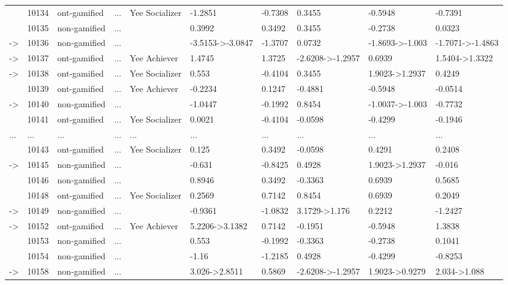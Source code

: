\documentclass[6pt]{article}
\begin{document}
\begin{landscape}
{\begin{longtable}{llllllllll}
&10134&ont-gamified&...&Yee Socializer&-1.2851&-0.7308&0.3455&-0.5948&-0.7391\tabularnewline
&10135&non-gamified&...&&0.3992&0.3492&0.3455&-0.2738&0.0323\tabularnewline
-\textgreater &10136&non-gamified&...&&-3.5153-\textgreater -3.0847&-1.3707&0.0732&-1.8693-\textgreater -1.003&-1.7071-\textgreater -1.4863\tabularnewline
-\textgreater &10137&ont-gamified&...&Yee Achiever&1.4745&1.3725&-2.6208-\textgreater -1.2957&0.6939&1.5404-\textgreater 1.3322\tabularnewline
-\textgreater &10138&ont-gamified&...&Yee Socializer&0.553&-0.4104&0.3455&1.9023-\textgreater 1.2937&0.4249\tabularnewline
&10139&ont-gamified&...&Yee Achiever&-0.2234&0.1247&-0.4881&-0.5948&-0.0514\tabularnewline
-\textgreater &10140&non-gamified&...&&-1.0447&-0.1992&0.8454&-1.0037-\textgreater -1.003&-0.7732\tabularnewline
&10141&ont-gamified&...&Yee Socializer&0.0021&-0.4104&-0.0598&-0.4299&-0.1946\tabularnewline
...&...&...&...&...&...&...&...&...&...\tabularnewline
&10143&ont-gamified&...&Yee Socializer&0.125&0.3492&-0.0598&0.4291&0.2408\tabularnewline
-\textgreater &10145&non-gamified&...&&-0.631&-0.8425&0.4928&1.9023-\textgreater 1.2937&-0.016\tabularnewline
&10146&non-gamified&...&&0.8946&0.3492&-0.3363&0.6939&0.5685\tabularnewline
&10148&ont-gamified&...&Yee Socializer&0.2569&0.7142&0.8454&0.6939&0.2049\tabularnewline
-\textgreater &10149&non-gamified&...&&-0.9361&-1.0832&3.1729-\textgreater 1.176&0.2212&-1.2427\tabularnewline
-\textgreater &10152&ont-gamified&...&Yee Achiever&5.2206-\textgreater 3.1382&0.7142&-0.1951&-0.5948&1.3838\tabularnewline
&10153&non-gamified&...&&0.553&-0.1992&-0.3363&-0.2738&0.1041\tabularnewline
&10154&non-gamified&...&&-1.16&-1.2185&0.4928&-0.4299&-0.8253\tabularnewline
-\textgreater &10158&non-gamified&...&&3.026-\textgreater 2.8511&0.5869&-2.6208-\textgreater -1.2957&1.9023-\textgreater 0.9279&2.034-\textgreater 1.088\tabularnewline
\hline
\end{longtable}}\end{landscape}
\end{document}
